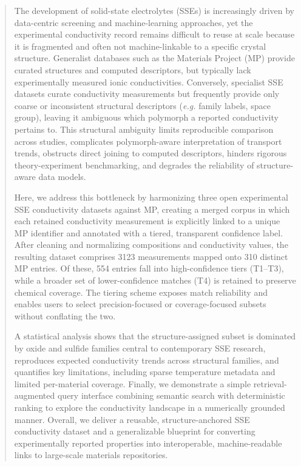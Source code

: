 \documentclass[a4paper,fleqn]{cas-sc}
\begin{document}
\begin{abstract}
The development of solid-state electrolytes (SSEs) is increasingly driven by data-centric screening and machine-learning approaches, yet the experimental conductivity record remains difficult to reuse at scale because it is fragmented and often not machine-linkable to a specific crystal structure. Generalist databases such as the Materials Project (MP) provide curated structures and computed descriptors, but typically lack experimentally measured ionic conductivities. Conversely, specialist SSE datasets curate conductivity measurements but frequently provide only coarse or inconsistent structural descriptors (\textit{e.g.} family labels, space group), leaving it ambiguous which polymorph a reported conductivity pertains to. This structural ambiguity limits reproducible comparison across studies, complicates polymorph-aware interpretation of transport trends, obstructs direct joining to computed descriptors, hinders rigorous theory-experiment benchmarking, and degrades the reliability of structure-aware data models.

Here, we address this bottleneck by harmonizing three open experimental SSE conductivity datasets against MP, creating a merged corpus in which each retained conductivity measurement is explicitly linked to a unique MP identifier and annotated with a tiered, transparent confidence label. After cleaning and normalizing compositions and conductivity values, the resulting dataset comprises 3123 measurements mapped onto 310 distinct MP entries. Of these, 554 entries fall into high-confidence tiers (T1--T3), while a broader set of lower-confidence matches (T4) is retained to preserve chemical coverage. The tiering scheme exposes match reliability and enables users to select precision-focused or coverage-focused subsets without conflating the two.

A statistical analysis shows that the structure-assigned subset is dominated by oxide and sulfide families central to contemporary SSE research, reproduces expected conductivity trends across structural families, and quantifies key limitations, including sparse temperature metadata and limited per-material coverage. Finally, we demonstrate a simple retrieval-augmented query interface combining semantic search with deterministic ranking to explore the conductivity landscape in a numerically grounded manner. Overall, we deliver a reusable, structure-anchored SSE conductivity dataset and a generalizable blueprint for converting experimentally reported properties into interoperable, machine-readable links to large-scale materials repositories.
\end{abstract}
\end{document}
